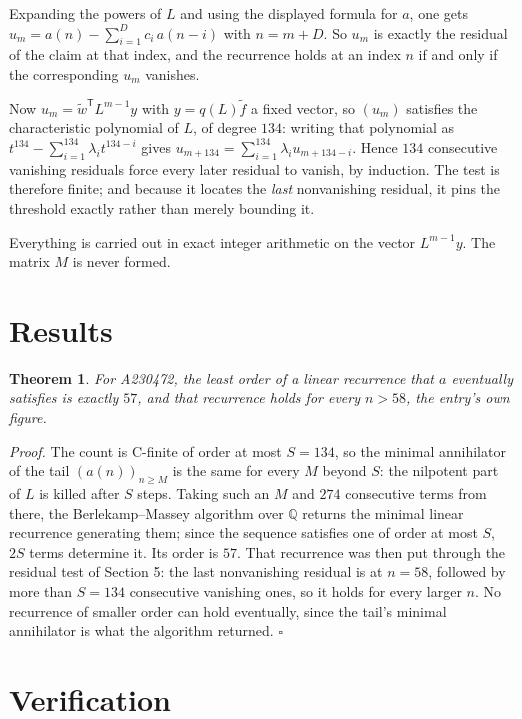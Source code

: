 \documentclass[11pt]{article}
\newtheorem{theorem}{Theorem}
\theoremstyle{definition}
\begin{document}
Expanding the powers of $L$ and using the displayed formula for $a$, one gets $u_m = a(n) - \sum_{i=1}^{D} c_i\,a(n-i)$ with $n = m + D$. So $u_m$ is exactly the residual of the claim at that index, and the recurrence holds at an index $n$ if and only if the corresponding $u_m$ vanishes.

Now $u_m = \tilde w^{\mathsf T} L^{m-1} y$ with $y = q(L)\tilde f$ a fixed vector, so $(u_m)$ satisfies the characteristic polynomial of $L$, of degree $134$: writing that polynomial as $t^{134} - \sum_{i=1}^{134} \lambda_i t^{134-i}$ gives $u_{m+134} = \sum_{i=1}^{134} \lambda_i u_{m+134-i}$. Hence $134$ consecutive vanishing residuals force every later residual to vanish, by induction. The test is therefore finite; and because it locates the {\itshape last} nonvanishing residual, it pins the threshold exactly rather than merely bounding it.

Everything is carried out in exact integer arithmetic on the vector $L^{m-1}y$. The matrix $M$ is never formed.

\section{Results}

\begin{theorem} For A230472, the least order of a linear recurrence that $a$ eventually satisfies is exactly $57$, and that recurrence holds for every $n > 58$, the entry's own figure.\end{theorem}

{\itshape Proof.} The count is C-finite of order at most $S = 134$, so the minimal annihilator of the tail $(a(n))_{n \ge M}$ is the same for every $M$ beyond $S$: the nilpotent part of $L$ is killed after $S$ steps. Taking such an $M$ and $274$ consecutive terms from there, the Berlekamp--Massey algorithm over $\mathbb{Q}$ returns the minimal linear recurrence generating them; since the sequence satisfies one of order at most $S$, $2S$ terms determine it. Its order is $57$. That recurrence was then put through the residual test of Section 5: the last nonvanishing residual is at $n = 58$, followed by more than $S = 134$ consecutive vanishing ones, so it holds for every larger $n$. No recurrence of smaller order can hold eventually, since the tail's minimal annihilator is what the algorithm returned. $\square$

\section{Verification}
\end{document}
